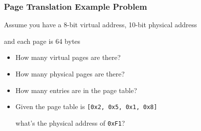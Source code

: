   \begin{frame}
    \frametitle{Page Translation Example Problem}

    Assume you have a 8-bit virtual address, 10-bit physical address

    \hspace{2em} and each page is 64 bytes

    \begin{itemize}
      \item How many virtual pages are there? 
      \item How many physical pages are there? 
      \item How many entries are in the page table? 
      \item Given the page table is \texttt{{[0x2, 0x5, 0x1, 0x8]}}

            \hspace{2em} what's the physical address of \texttt{0xF1}?

    \end{itemize}
  \end{frame}

